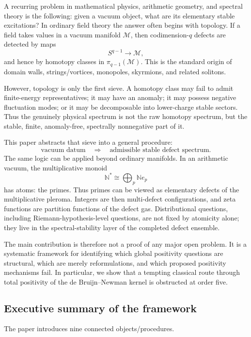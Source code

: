 \documentclass[11pt]{article}
\newcommand{\M}{\mathcal M}
\newcommand{\N}{\mathbb N}
\begin{document}
A recurring problem in mathematical physics, arithmetic geometry, and spectral theory is the following: given a vacuum object, what are its elementary stable excitations? In ordinary field theory the answer often begins with topology. If a field takes values in a vacuum manifold $\M$, then codimension-$q$ defects are detected by maps
\[
        S^{q-1}\longrightarrow \M,
\]
and hence by homotopy classes in $\pi_{q-1}(\M)$. This is the standard origin of domain walls, strings/vortices, monopoles, skyrmions, and related solitons.

However, topology is only the first sieve. A homotopy class may fail to admit finite-energy representatives; it may have an anomaly; it may possess negative fluctuation modes; or it may be decomposable into lower-charge stable sectors. Thus the genuinely physical spectrum is not the raw homotopy spectrum, but the stable, finite, anomaly-free, spectrally nonnegative part of it.

This paper abstracts that sieve into a general procedure:
\[
\boxed{
    \text{vacuum datum}
    \quad\Longrightarrow\quad
    \text{admissible stable defect spectrum}.
}
\]
The same logic can be applied beyond ordinary manifolds. In an arithmetic vacuum, the multiplicative monoid
\[
        \N^*\cong \bigoplus_p \N e_p
\]
has atoms: the primes. Thus primes can be viewed as elementary defects of the multiplicative pleroma. Integers are then multi-defect configurations, and zeta functions are partition functions of the defect gas. Distributional questions, including Riemann-hypothesis-level questions, are not fixed by atomicity alone; they live in the spectral-stability layer of the completed defect ensemble.

The main contribution is therefore not a proof of any major open problem. It is a systematic framework for identifying which global positivity questions are structural, which are merely reformulations, and which proposed positivity mechanisms fail. In particular, we show that a tempting classical route through total positivity of the de Bruijn--Newman kernel is obstructed at order five.

\subsection{Executive summary of the framework}

The paper introduces nine connected objects/procedures.
\end{document}
